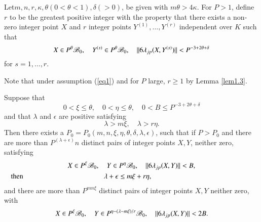 \begin{defi*}
Let\pageoriginale $m,n,r,\kappa,\theta(0<\theta <1),\delta (> 0)$, be given 
with $m\theta>4\kappa$. For $P>1$, define $r$ to be the greatest positive 
integer with the property that there exists a non-zero integer point 
$X$ and $r$ integer points $Y^{(1)},\ldots,Y^{(r)}$ independent over 
$K$ such that 
$$
X\in P^\theta\mathscr{B}_0,\quad Y^{(s)}\in P^\theta\mathscr{B}_0,\quad 
||6\lambda_{jp} (X,Y^{(s)})||<P^{-3+2\theta+\delta}
$$
for $s=1,\ldots,r$.
\end{defi*}

Note that under assumption (\ref{eq1}) and for $P$ large, $r\geq 1$ by 
Lemma \ref{lem1.3}. 

\begin{lemma}\label{lem1.5}
Suppose that 
$$
0<\xi\leq\theta,\quad 0<\eta\leq\theta,\quad 0<B\leq 
P^{-3+2\theta+\delta} 
$$
and that $\lambda$ and $\epsilon$ are positive satisfying
$$
\lambda>m\xi,\quad\lambda>r\eta.
$$
Then there exists a 
$P_0=P_0(m,n,\xi,\eta,\theta,\delta,\lambda,\epsilon)$, such that if 
$P>P_0$ and there are more than $P^{(\lambda+\epsilon)}n$ distinct 
pairs of integer points $X,Y$, neither zero, satisfying
\begin{gather}
 X\in P^\xi\sB_0,\quad Y\in P^\eta\sB_0,\quad 
 ||6\lambda_{jp}(X,Y)||<B,\label{eq2}\\
\text{then}\hspace{4cm} \lambda+\epsilon\leq m\xi+r\eta,\notag\hspace{5cm}
\end{gather}
and there are more than $P^{mn\xi}$ distinct pairs of integer points 
$X,Y$ neither zero, with 
$$
X\in P^\xi\mathscr{B}_0,\quad Y\in P^{\eta-(\lambda-m\xi)/r}\mathscr{B}_0,\quad 
||6\lambda_{jp}(X,Y)||<2B.
$$
\end{lemma}

